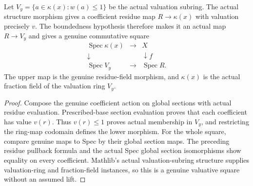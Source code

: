 \begin{definition}
\label{scheme:bounded-native-valuative-square}
\leanok
{}
Let $V_y=\{a\in\kappa(x):w(a)\leq1\}$ be the actual valuation subring.
The actual structure morphism gives a coefficient residue map
$R\to\kappa(x)$ with valuation precisely $v$. The boundedness hypothesis
therefore makes it an actual map $R\to V_y$ and gives a genuine commutative
square
\[
\begin{array}{ccc}
\operatorname{Spec}\kappa(x)&\longrightarrow&X\\
\downarrow&&\downarrow f\\
\operatorname{Spec}V_y&\longrightarrow&\operatorname{Spec}R.
\end{array}
\]
The upper map is the genuine residue-field morphism, and
$\kappa(x)$ is the actual fraction field of the valuation ring $V_y$.
\end{definition}
\begin{proof}
Compose the genuine coefficient action on global sections with actual
residue evaluation. Prescribed-base section evaluation proves that each
coefficient has value $v(r)$. Thus $v(r)\leq1$ proves actual membership in
$V_y$, and restricting the ring-map codomain defines the lower morphism.
For the whole square, compare genuine maps to Spec by their global section
maps. The preceding residue pullback formula and the actual Spec global
section isomorphisms show equality on every coefficient. Mathlib's actual
valuation-subring structure supplies valuation-ring and fraction-field
instances, so this is a genuine valuative square without an assumed lift.
\end{proof}


